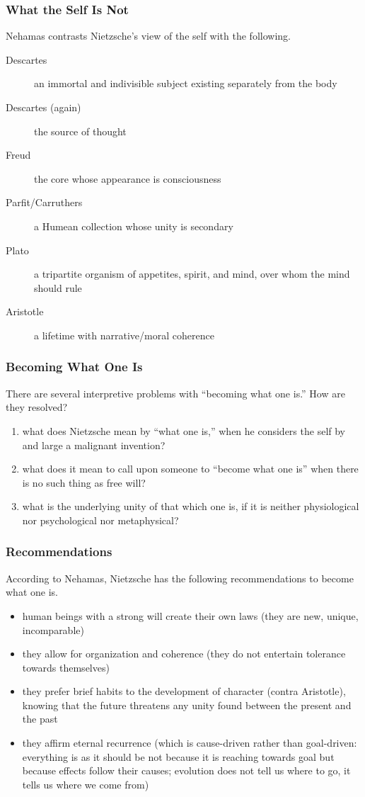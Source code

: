\documentclass[xcolor=dvipsnames]{beamer}
\begin{document}
\begin{frame}
  \frametitle{What the Self Is Not}
  Nehamas contrasts Nietzsche's view of the self with the following.
  \begin{description}
  \item[Descartes] an immortal and indivisible subject existing
    separately from the body
  \item[Descartes (again)] the source of thought
  \item[Freud] the core whose appearance is consciousness
  \item[Parfit/Carruthers] a Humean collection whose unity is
    secondary
  \item[Plato] a tripartite organism of appetites, spirit, and mind,
    over whom the mind should rule
  \item[Aristotle] a lifetime with narrative/moral coherence
  \end{description}
\end{frame}

\begin{frame}
  \frametitle{Becoming What One Is}
  There are several interpretive problems with ``becoming what one
  is.'' How are they resolved?
  \begin{enumerate}
  \item what does Nietzsche mean by ``what one is,'' when he considers
    the self by and large a malignant invention?
  \item what does it mean to call upon someone to ``become what one
    is'' when there is no such thing as free will?
  \item what is the underlying unity of that which one is, if it is
    neither physiological nor psychological nor metaphysical?
  \end{enumerate}
\end{frame}

\begin{frame}
  \frametitle{Recommendations}
  According to Nehamas, Nietzsche has the following recommendations to
  become what one is.
  \begin{itemize}
  \item human beings with a strong will create their own laws (they are new, unique, incomparable)
  \item they allow for organization and coherence (they do not
    entertain tolerance towards themselves)
  \item they prefer brief habits to the development of character
    (contra Aristotle), knowing that the future threatens any unity
    found between the present and the past
  \item they affirm eternal recurrence (which is cause-driven rather
    than goal-driven: everything is as it should be not because it is
    reaching towards goal but because effects follow their causes;
    evolution does not tell us where to go, it tells us where we come
    from)
\end{itemize}
\end{frame}
\end{document}
